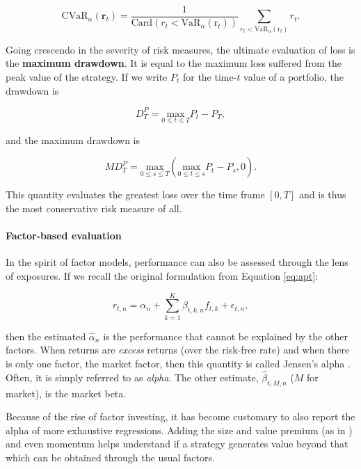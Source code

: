 \begin{equation}
\text{CVaR}_\alpha(\textbf{r}_t)=\frac{1}{\text{Card}(r_t < \text{VaR}_\alpha(\text{r}_t))}\sum_{r_t < \text{VaR}_\alpha(\text{r}_t)}r_t.
\end{equation}

Going crescendo in the severity of risk measures, the ultimate evaluation of loss is the \textbf{maximum drawdown}. It is equal to the maximum loss suffered from the peak value of the strategy. If we write $P_t$ for the time-$t$ value of a portfolio, the drawdown is

\begin{equation}
D_T^P=\underset{0 \le t \le T}{\text{max}} P_t-P_T ,
\end{equation}

and the maximum drawdown is

\begin{equation}
MD_T^P=\underset{0 \le s \le T}{\text{max}} \left(\underset{0 \le t \le s}{\text{max}} P_t-P_s, 0\right) .
\end{equation}

This quantity evaluates the greatest loss over the time frame $[0,T]$ and is thus the most conservative risk measure of all.

\paragraph{Factor-based evaluation}

In the spirit of factor models, performance can also be assessed through the lens of exposures. If we recall the original formulation from Equation \ref{eq:apt}:

\begin{equation}
r_{t,n}= \alpha_n+\sum_{k=1}^K\beta_{t,k,n}f_{t,k}+\epsilon_{t,n},
\end{equation}

then the estimated $\hat{\alpha}_n$ is the performance that cannot be explained by the other factors. When returns are \textit{excess} returns (over the risk-free rate) and when there is only one factor, the market factor, then this quantity is called Jensen's alpha \citep{jensen1968performance}. Often, it is simply referred to as \textit{alpha}. The other estimate, $\hat{\beta}_{t,M,n}$ ($M$ for market), is the market beta.

Because of the rise of factor investing, it has become customary to also report the alpha of more exhaustive regressions. Adding the size and value premium (as in \cite{fama1993common}) and even momentum \citep{carhart1997persistence} helps understand if a strategy generates value beyond that which can be obtained through the usual factors.

